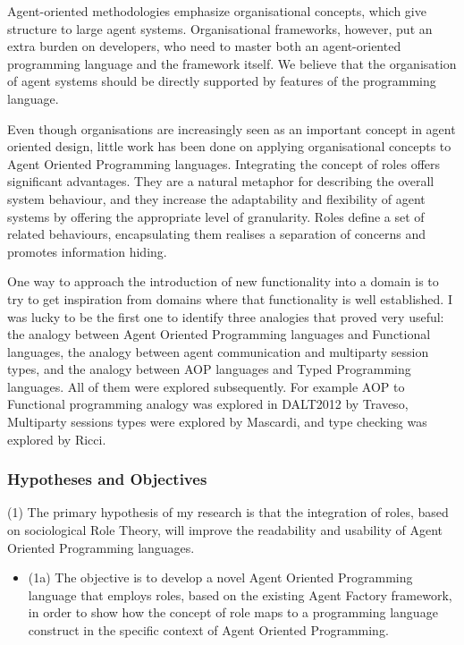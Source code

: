 \documentclass[a4paper,12pt,oneside,fleqn]{book} %
\begin{document}
Agent-oriented methodologies emphasize organisational concepts, which give
structure to large agent systems. Organisational frameworks, however, put
an extra burden on developers, who need to master both an agent-oriented
programming language and the framework itself. We believe that the
organisation of agent systems should be directly supported by features of
the programming language.

Even though organisations are increasingly seen as an important concept in
agent oriented design, little work has been done on applying organisational
concepts to Agent Oriented Programming languages. Integrating the concept
of roles offers significant advantages. They are a natural metaphor for
describing the overall system behaviour, and they increase the adaptability
and flexibility of agent systems by offering the appropriate level of
granularity. Roles define a set of related behaviours, encapsulating them
realises a separation of concerns and promotes information hiding.

One way to approach the introduction of new functionality into a domain is
to try to get inspiration from domains where that functionality is well
established. I was lucky to be the first one to identify three analogies
that proved very useful: the analogy between Agent Oriented Programming
languages and Functional languages, the analogy between agent communication
and multiparty session types, and the analogy between AOP languages and
Typed Programming languages. All of them were explored subsequently. For
example AOP to Functional programming analogy was explored in DALT2012 by
Traveso, Multiparty sessions types were explored by Mascardi, and type
checking was explored by Ricci.

\subsubsection{Hypotheses and Objectives}
(1) The primary hypothesis of my research is that the integration of roles,
based on sociological Role Theory, will improve the readability and
usability of Agent Oriented Programming languages. 
\begin{itemize}

  \item (1a) The objective is to develop a novel Agent Oriented Programming
    language that employs roles, based on the existing Agent Factory
    framework, in order to show how the concept of role maps to a
    programming language construct in the specific context of Agent
    Oriented Programming.

\end{itemize}
\end{document}
